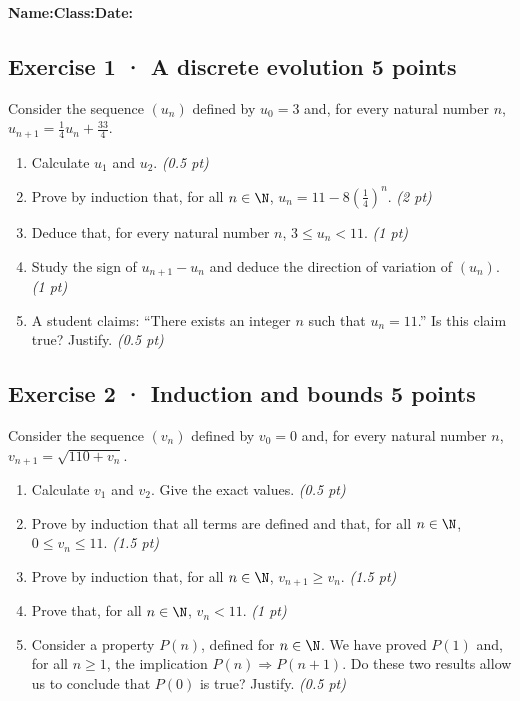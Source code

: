 \smallskip\textbf{Name:}\enspace\dotfill\quad\textbf{Class:}\enspace\dotfill\quad\textbf{Date:}\enspace\dotfill

\subsection*{Exercise 1 · A discrete evolution \hfill 5 points}Consider the sequence $(u_n)$ defined by $u_0=3$ and, for every natural number $n$, $u_{n+1}=\frac{1}{4}u_n+\frac{33}{4}$.

\begin{enumerate}

\item Calculate $u_1$ and $u_2$. \hfill\textit{(0.5 pt)}

\item Prove by induction that, for all $n\in\N$, $u_n=11-8\left(\frac{1}{4}\right)^n$. \hfill\textit{(2 pt)}

\item Deduce that, for every natural number $n$, $3\le u_n<11$. \hfill\textit{(1 pt)}

\item Study the sign of $u_{n+1}-u_n$ and deduce the direction of variation of $(u_n)$. \hfill\textit{(1 pt)}

\item A student claims: ``There exists an integer $n$ such that $u_n=11$.'' Is this claim true? Justify. \hfill\textit{(0.5 pt)}

\end{enumerate}

\subsection*{Exercise 2 · Induction and bounds \hfill 5 points}Consider the sequence $(v_n)$ defined by $v_0=0$ and, for every natural number $n$, $v_{n+1}=\sqrt{110+v_n}$.

\begin{enumerate}

\item Calculate $v_1$ and $v_2$. Give the exact values. \hfill\textit{(0.5 pt)}

\item Prove by induction that all terms are defined and that, for all $n\in\N$, $0\le v_n\le11$. \hfill\textit{(1.5 pt)}

\item Prove by induction that, for all $n\in\N$, $v_{n+1}\ge v_n$. \hfill\textit{(1.5 pt)}

\item Prove that, for all $n\in\N$, $v_n<11$. \hfill\textit{(1 pt)}

\item Consider a property $P(n)$, defined for $n\in\N$. We have proved $P(1)$ and, for all $n\ge1$, the implication $P(n)\Rightarrow P(n+1)$. Do these two results allow us to conclude that $P(0)$ is true? Justify. \hfill\textit{(0.5 pt)}

\end{enumerate}


